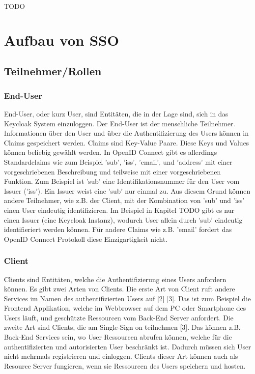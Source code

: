 TODO


\section{Aufbau von SSO}

\subsection{Teilnehmer/Rollen}

\subsubsection{End-User} \label{EB_End-User}

End-User, oder kurz User, sind Entitäten, die in der Lage sind, sich in das Keycloak System einzuloggen. Der End-User ist der menschliche Teilnehmer. Informationen über den User und über die Authentifizierung des Users können in Claims gespeichert werden. Claims sind Key-Value Paare. Diese Keys und Values können beliebig gewählt werden. In OpenID Connect gibt es allerdings Standardclaims wie zum Beispiel 'sub', 'iss', 'email', und 'address' mit einer vorgeschriebenen Beschreibung und teilweise mit einer vorgeschriebenen Funktion. Zum Beispiel ist 'sub' eine Identifikationsnummer für den User vom Issuer ('iss'). Ein Issuer weist eine 'sub' nur einmal zu. Aus diesem Grund können andere Teilnehmer, wie z.B. der Client, mit der Kombination von 'sub' und 'iss' einen User eindeutig identifizieren. Im Beispiel in Kapitel TODO gibt es nur einen Issuer (eine Keycloak Instanz), wodurch User allein durch 'sub' eindeutig identifieriert werden können. Für andere Claims wie z.B. 'email' fordert das OpenID Connect Protokoll diese Einzigartigkeit nicht.

\subsubsection{Client}

Clients sind Entitäten, welche die Authentifizierung eines Users anfordern können. Es gibt zwei Arten von Clients. Die erste Art von Client ruft andere Services im Namen des authentifizierten Users auf [2] [3]. Das ist zum Beispiel die Frontend Applikation, welche im Webbrowser auf dem PC oder Smartphone des Users läuft, und geschützte Ressourcen vom Back-End Server anfordert. Die zweite Art sind Clients, die am Single-Sign on teilnehmen [3]. Das können z.B. Back-End Services sein, wo User Ressourcen abrufen können, welche für die authentifizierten und autorisierten User beschränkt ist. Dadurch müssen sich User nicht mehrmals registrieren und einloggen. Clients dieser Art können auch als Resource Server fungieren, wenn sie Ressourcen des Users speichern und hosten.

